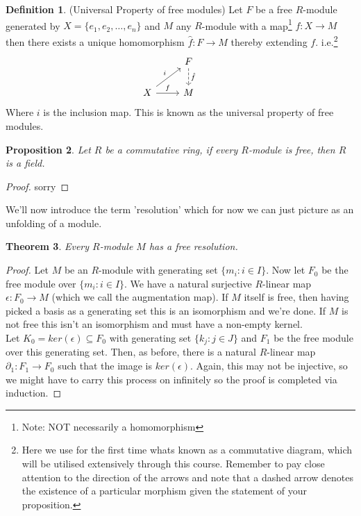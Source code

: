 \documentclass[12pt]{book}
\newtheorem{theorem}{Theorem}[chapter]
\newtheorem{proposition}[theorem]{Proposition}
\theoremstyle{definition}
\newtheorem{definition}[theorem]{Definition}
\begin{document}
\begin{definition}\label{UnivPropFree}
    (Universal Property of free modules) Let $F$ be a free $R$-module generated by $X = \{e_1, e_2, \dots, e_n\}$ and $M$ any $R$-module with a map\footnote{Note: NOT necessarily a homomorphism} $f : X \to M$ then there exists a unique homomorphism $\hat{f} : F \to M$ thereby extending $f$. i.e.\footnote{Here we use for the first time whats known as a commutative diagram, which will be utilised extensively through this course. Remember to pay close attention to the direction of the arrows and note that a dashed arrow denotes the existence of a particular morphism given the statement of your proposition.}
    \[
    \begin{tikzcd}
    & F  \arrow[d, dashed, "\hat{f}"] & \\
    X \arrow[ru, "i"] \arrow[r, "f"] & M &
    \end{tikzcd}
    \]
    Where $i$ is the inclusion map. This is known as the universal property of free modules. 
\end{definition}



\begin{proposition}
    Let $R$ be a commutative ring, if every $R$-module is free, then $R$ is a field. 
\end{proposition}
\begin{proof}
    sorry
\end{proof}

We'll now introduce the term 'resolution' which for now we can just picture as an unfolding of a module. 

\begin{theorem}
    \label{Free Theorem}
    Every $R$-module $M$ has a free resolution.
\end{theorem}
\begin{proof}
    Let $M$ be an $R$-module with generating set $\{m_i : i \in I\}$. Now let $F_0$ be the free module over $\{m_i: i \in I\}$. We have a natural surjective $R$-linear map $\epsilon: F_0 \to M$ (which we call the augmentation map). If $M$ itself is free, then having picked a basis as a generating set this is an isomorphism and we're done. If $M$ is not free this isn't an isomorphism and must have a non-empty kernel.\\ Let $K_0 = ker(\epsilon) \subseteq F_0$ with generating set $\{k_j: j \in J\}$ and $F_1$ be the free module over this generating set. Then, as before, there is a natural $R$-linear map $\partial_1 : F_1 \to F_0$ such that the image is $ker(\epsilon)$. Again, this may not be injective, so we might have to carry this process on infinitely so the proof is completed via induction. 
\end{proof}
\end{document}
